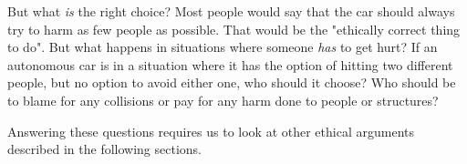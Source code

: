 \newpar But what \textit{is} the right choice? Most people would say that the car should always try to harm as few people as possible. That would be the "ethically correct thing to do". But what happens in situations where someone \textit{has} to get hurt? If an autonomous car is in a situation where it has the option of hitting two different people, but no option to avoid either one, who should it choose? Who should be to blame for any collisions or pay for any harm done to people or structures? 

Answering these questions requires us to look at other ethical arguments described in the following sections.   
